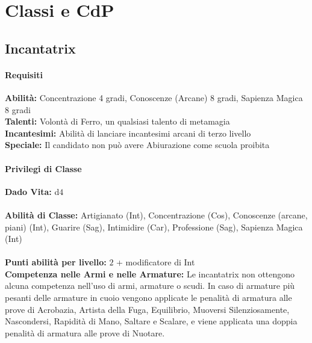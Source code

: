 \documentclass[10pt, a4paper]{report}
\begin{document}
\chapter{Classi e CdP}
\begin{multicols}{2}
\section{Incantatrix}

\subsubsection*{Requisiti}
\textbf{Abilità:} Concentrazione 4 gradi, Conoscenze (Arcane) 8 gradi, Sapienza Magica 8 gradi\\
\textbf{Talenti:} Volontà di Ferro, un qualsiasi talento di metamagia\\
\textbf{Incantesimi:} Abilità di lanciare incantesimi arcani di terzo livello\\
\textbf{Speciale:} Il candidato non può avere Abiurazione come scuola proibita\\
\subsubsection*{Privilegi di Classe}
\textbf{Dado Vita:} d$4$\\
\\
\textbf{Abilità di Classe:} Artigianato (Int), Concentrazione (Cos), Conoscenze (arcane, piani) (Int), Guarire (Sag), Intimidire (Car), Professione (Sag), Sapienza Magica (Int)\\
\\
\textbf{Punti abilità per livello:} $2$ + modificatore di Int\\

\textbf{Competenza nelle Armi e nelle Armature:} Le incantatrix non ottengono alcuna competenza nell'uso di armi, armature o scudi. In caso di armature più pesanti delle armature in cuoio vengono applicate le penalità di armatura alle prove di Acrobazia, Artista della Fuga, Equilibrio, Muoversi Silenziosamente, Nascondersi, Rapidità di Mano, Saltare e Scalare, e viene applicata una doppia penalità di armatura alle prove di Nuotare.\\


\end{multicols}
\end{document}
